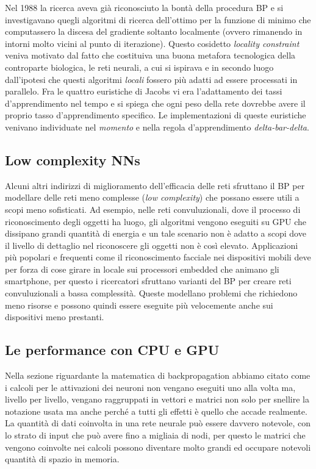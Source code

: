 Nel 1988 la ricerca aveva già riconosciuto la bontà della procedura BP e si investigavano quegli algoritmi di ricerca dell'ottimo per la funzione di minimo che computassero la discesa del gradiente soltanto localmente (ovvero rimanendo in intorni molto vicini al punto di iterazione). Questo cosidetto \textit{locality constraint} veniva motivato dal fatto che costituiva una buona metafora tecnologica della controparte biologica, le reti neurali, a cui si ispirava e in secondo luogo dall'ipotesi che questi algoritmi \textit{locali} fossero più adatti ad essere processati in parallelo.
Fra le quattro euristiche di Jacobs vi era l'adattamento dei tassi d'apprendimento nel tempo e si spiega che ogni peso della rete dovrebbe avere il proprio tasso d'apprendimento specifico. Le implementazioni di queste euristiche venivano individuate nel \textit{momento} e nella regola d'apprendimento \textit{delta-bar-delta}.
\subsection*{Low complexity NNs}
Alcuni altri indirizzi di miglioramento dell'efficacia delle reti sfruttano il BP per modellare delle reti meno complesse (\textit{low complexity}) che possano essere utili a scopi meno sofisticati. Ad esempio, nelle reti convuluzionali, dove il processo di riconoscimento degli oggetti ha luogo, gli algoritmi vengono eseguiti su GPU che dissipano grandi quantità di energia e un tale scenario non è adatto a scopi dove il livello di dettaglio nel riconoscere gli oggetti non è così elevato. Applicazioni più popolari e frequenti come il riconoscimento facciale nei dispositivi mobili deve per forza di cose girare in locale sui processori embedded che animano gli smartphone, per questo i ricercatori sfruttano varianti del BP per creare reti convuluzionali a bassa complessità. Queste modellano problemi che richiedono meno risorse e possono quindi essere eseguite più velocemente anche sui dispositivi meno prestanti\cite{TSD}.
\subsection*{Le performance con CPU e GPU}
Nella sezione riguardante la matematica di backpropagation abbiamo citato come i calcoli per le attivazioni dei neuroni non vengano eseguiti uno alla volta ma, livello per livello, vengano raggruppati in vettori e matrici non solo per snellire la notazione usata ma anche perché a tutti gli effetti è quello che accade realmente. La quantità di dati coinvolta in una rete neurale può essere davvero notevole, con lo strato di input che può avere fino a migliaia di nodi, per questo le matrici che vengono coinvolte nei calcoli possono diventare molto grandi ed occupare notevoli quantità di spazio in memoria.\\ 


